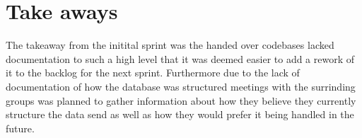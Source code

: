 \section{Take aways}
The takeaway from the initital sprint was the handed over codebases lacked documentation to such a high 
level that it was deemed easier to add a rework of it to the backlog for the next sprint. Furthermore due 
to the lack of documentation of how the database was structured meetings with the surrinding groups was 
planned to gather information about how they believe they currently structure the data send as well as 
how they would prefer it being handled in the future.

